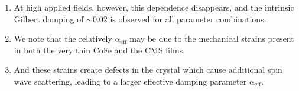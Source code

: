 \begin{enumerate}
    \item At high applied fields, however, this dependence disappears, and the intrinsic Gilbert damping of $\sim 0.02$ is observed for all parameter combinations.
    \item We note that the relatively $\mathrm{\alpha_{eff}}$ may be due to the mechanical strains present in both the very thin CoFe and the CMS films.
    \item And these strains create defects in the crystal which cause additional spin wave scattering, leading to a larger effective damping parameter $\mathrm{\alpha_{eff}}$.
\end{enumerate}
